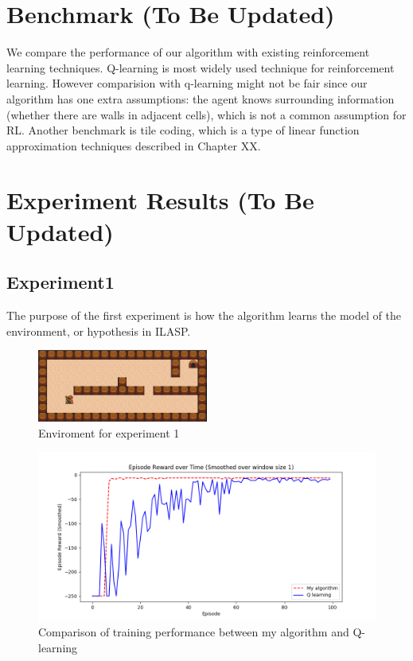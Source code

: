 \section{Benchmark (To Be Updated)}

We compare the performance of our algorithm with existing reinforcement learning techniques. 
Q-learning is most widely used technique for reinforcement learning. However comparision with q-learning might not be fair 
since our algorithm has one extra assumptions: the agent knows surrounding information (whether there are walls in adjacent cells), 
which is not a common assumption for RL.
Another benchmark is tile coding, which is a type of linear function approximation techniques described in Chapter XX. 

\section{Experiment Results (To Be Updated)}
\label{learning_evaluation}

\subsection{Experiment1}
The purpose of the first experiment is how the algorithm learns the model of the environment, or hypothesis in ILASP.

\begin{figure}[!htb]
\centering
\includegraphics[width=0.5\textwidth]{./figures/experiment1}
\caption{Enviroment for experiment 1}
\label{experiment1}
\end{figure}
    

\begin{figure}[!htb]
\centering
\includegraphics[width=1.0\textwidth]{./figures/experiment1_training}
\caption{Comparison of training performance between my algorithm and Q-learning}
\label{experiment1_training}
\end{figure}


